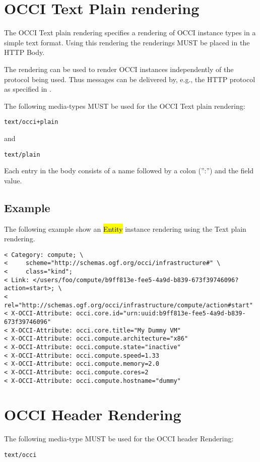 \documentclass[10pt,a4paper]{article}
\begin{document}
\section{OCCI Text Plain rendering}
\label{sec:text}
The OCCI Text plain rendering specifies a rendering of OCCI instance types in a simple text format. Using this rendering the renderings MUST be placed in the HTTP Body.

The rendering can be used to render OCCI instances independently of the
protocol being used. Thus messages can be delivered by, e.g., the HTTP
protocol as specified in \cite{occi:http_protocol}.

The following media-types MUST be used for the OCCI Text plain rendering:

	{\tt text/occi+plain}

and

	{\tt text/plain}

Each entry in the body consists of a name followed by a colon (”:”) and the field value.

\subsection{Example}

The following example show an \hl{Entity} instance rendering using the Text plain rendering.

\begin{verbatim}
< Category: compute; \
<     scheme="http://schemas.ogf.org/occi/infrastructure#" \
<     class="kind";
< Link: </users/foo/compute/b9ff813e-fee5-4a9d-b839-673f39746096?action=start>; \
<     rel="http://schemas.ogf.org/occi/infrastructure/compute/action#start"
< X-OCCI-Attribute: occi.core.id="urn:uuid:b9ff813e-fee5-4a9d-b839-673f39746096"
< X-OCCI-Attribute: occi.core.title="My Dummy VM"
< X-OCCI-Attribute: occi.compute.architecture="x86"
< X-OCCI-Attribute: occi.compute.state="inactive"
< X-OCCI-Attribute: occi.compute.speed=1.33
< X-OCCI-Attribute: occi.compute.memory=2.0
< X-OCCI-Attribute: occi.compute.cores=2
< X-OCCI-Attribute: occi.compute.hostname="dummy"
\end{verbatim}

\section{OCCI Header Rendering}
\label{sec:header}
The following media-type MUST be used for the OCCI header Rendering:

{\tt text/occi}
\end{document}
